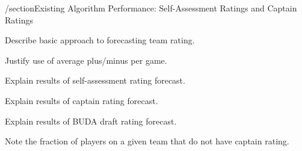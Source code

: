 /section{Existing Algorithm Performance: Self-Assessment Ratings and Captain Ratings}

Describe basic approach to forecasting team rating.

Justify use of average plus/minus per game.

Explain results of self-assessment rating forecast.

Explain results of captain rating forecast.

Explain results of BUDA draft rating forecast.

Note the fraction of players on a given team that do not have captain rating.